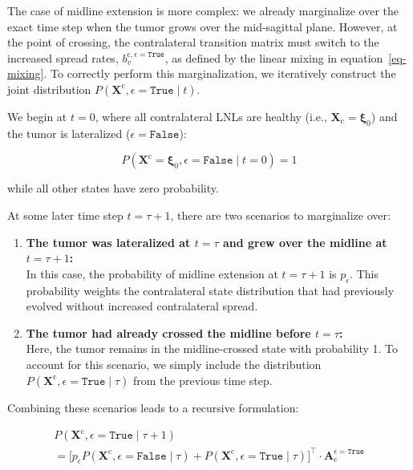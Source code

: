 \documentclass[
  sn-mathphys-num,
]{sn-jnl}
\begin{document}
The case of midline extension is more complex: we already marginalize
over the exact time step when the tumor grows over the mid-sagittal
plane. However, at the point of crossing, the contralateral transition
matrix must switch to the increased spread rates,
\(b_v^{\text{c}, \epsilon=\texttt{True}}\), as defined by the linear
mixing in equation~\ref{eq-mixing}. To correctly perform this
marginalization, we iteratively construct the joint distribution
\(P \left( \mathbf{X}^\text{c}, \epsilon=\texttt{True} \mid t \right)\).

We begin at \(t=0\), where all contralateral LNLs are healthy (i.e.,
\(\mathbf{X}_\text{c}=\boldsymbol{\xi}_0\)) and the tumor is lateralized
(\(\epsilon=\texttt{False}\)):

\[
P \left( \mathbf{X}^\text{c} = \boldsymbol{\xi}_0, \epsilon=\texttt{False} \mid t=0 \right) = 1
\]

while all other states have zero probability.

At some later time step \(t=\tau+1\), there are two scenarios to
marginalize over:

\begin{enumerate}
\def\labelenumi{\arabic{enumi}.}
\item
  \textbf{The tumor was lateralized at \(t=\tau\) and grew over the
  midline at \(t=\tau+1\):}\\
  In this case, the probability of midline extension at \(t=\tau+1\) is
  \(p_\epsilon\). This probability weights the contralateral state
  distribution that had previously evolved without increased
  contralateral spread.
\item
  \textbf{The tumor had already crossed the midline before
  \(t=\tau\):}\\
  Here, the tumor remains in the midline-crossed state with probability
  1. To account for this scenario, we simply include the distribution
  \(P\left( \mathbf{X}^\text{c}, \epsilon=\texttt{True} \mid \tau \right)\)
  from the previous time step.
\end{enumerate}

Combining these scenarios leads to a recursive formulation:

\[
\begin{multlined}
P \left( \mathbf{X}^\text{c}, \epsilon=\texttt{True} \mid \tau + 1 \right) \\
= \big[ p_\epsilon P \left( \mathbf{X}^\text{c}, \epsilon=\texttt{False} \mid \tau \right) + P \left( \mathbf{X}^\text{c}, \epsilon=\texttt{True} \mid \tau \right) \big]^\top \cdot \mathbf{A}_\text{c}^{\epsilon=\texttt{True}}
\end{multlined}
\]
\end{document}
